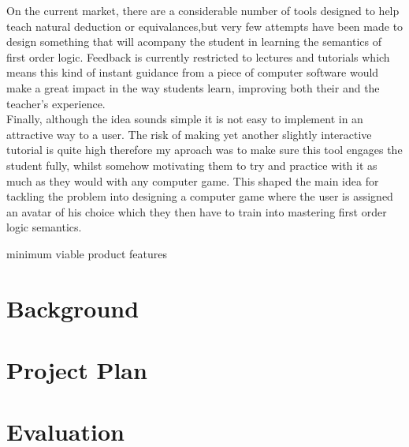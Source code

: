 \documentclass{article}
\begin{document}
On the current market, there are a considerable number of tools designed to help teach natural deduction or equivalances,but very few attempts have been made to design something that will acompany the student in learning the semantics of first order logic. Feedback is currently restricted to lectures and tutorials which means this kind of instant guidance from a piece of computer software would make a great impact in the way students learn, improving both their and the teacher's experience.\\

Finally, although the idea sounds simple it is not easy to implement in an attractive way to a user. The risk of making yet another slightly interactive tutorial is quite high therefore my aproach was to make sure this tool engages the student fully, whilst somehow motivating them to try and practice with it as much as they would with any computer game. This shaped the main idea for tackling the problem into designing a computer game where the user is assigned an avatar of his choice which they then have to train into mastering first order logic semantics.

minimum viable product features


\section{Background}		%

\section{Project Plan}		%

\section{Evaluation}		%
\end{document}
